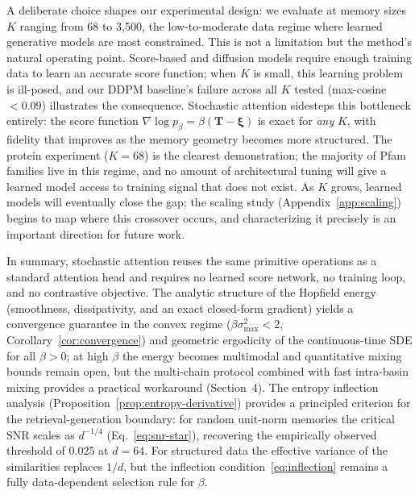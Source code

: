 A deliberate choice shapes our experimental design: we evaluate at memory sizes $K$ ranging from 68 to 3{,}500, the low-to-moderate data regime where learned generative models are most constrained. This is not a limitation but the method's natural operating point. Score-based and diffusion models require enough training data to learn an accurate score function; when $K$ is small, this learning problem is ill-posed, and our DDPM baseline's failure across all $K$ tested (max-cosine $<0.09$) illustrates the consequence. Stochastic attention sidesteps this bottleneck entirely: the score function $\nabla\log p_\beta = \beta(\mathbf{T}-\boldsymbol{\xi})$ is exact for \emph{any} $K$, with fidelity that improves as the memory geometry becomes more structured. The protein experiment ($K{=}68$) is the clearest demonstration; the majority of Pfam families live in this regime, and no amount of architectural tuning will give a learned model access to training signal that does not exist. As $K$ grows, learned models will eventually close the gap; the scaling study (Appendix~\ref{app:scaling}) begins to map where this crossover occurs, and characterizing it precisely is an important direction for future work.

In summary, stochastic attention reuses the same primitive operations as a standard attention head and requires no learned score network, no training loop, and no contrastive objective. The analytic structure of the Hopfield energy (smoothness, dissipativity, and an exact closed-form gradient) yields a convergence guarantee in the convex regime ($\beta\sigma_{\max}^{2}<2$, Corollary~\ref{cor:convergence}) and geometric ergodicity of the continuous-time SDE for all $\beta>0$; at high $\beta$ the energy becomes multimodal and quantitative mixing bounds remain open, but the multi-chain protocol combined with fast intra-basin mixing provides a practical workaround (Section~4). The entropy inflection analysis (Proposition~\ref{prop:entropy-derivative}) provides a principled criterion for the retrieval-generation boundary: for random unit-norm memories the critical SNR scales as $d^{-1/4}$ (Eq.~\ref{eq:snr-star}), recovering the empirically observed threshold of $0.025$ at $d{=}64$. For structured data the effective variance of the similarities replaces $1/d$, but the inflection condition~\eqref{eq:inflection} remains a fully data-dependent selection rule for $\beta$.

